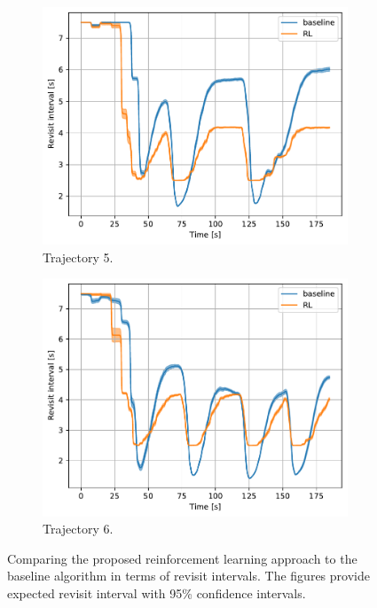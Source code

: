 \documentclass[english, 12pt, a4paper, elec, utf8, a-1b, online]{aaltothesis}
\begin{document}
\begin{figure}[htb]
\begin{subfigure}[b]{0.45\textwidth}
        \centering
        \includegraphics[width=\linewidth]{figures/benchmark/Simulations/revisit_intervals_4.pdf}
        \caption{Trajectory 5.}
        \label{fig:RI_T5}
    \end{subfigure}
    \hfill
    \begin{subfigure}[b]{0.45\textwidth}
        \centering
        \includegraphics[width=\linewidth]{figures/benchmark/Simulations/revisit_intervals_5.pdf}
        \caption{Trajectory 6.}
        \label{fig:RI_T6}
    \end{subfigure}
    \caption{Comparing the proposed reinforcement learning approach to the baseline algorithm in terms of revisit intervals.
    The figures provide expected revisit interval with 95\% confidence intervals.}
    \label{fig:revisit_interval_comparison}
\end{figure}
\end{document}
